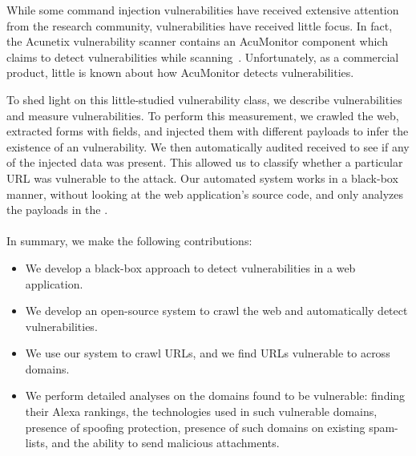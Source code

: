 While some command injection vulnerabilities have received extensive attention from the research community, \ehi vulnerabilities have received little focus. In fact, the Acunetix vulnerability scanner contains an AcuMonitor component which claims to detect \ehi vulnerabilities while scanning~\cite{acumonitor}. Unfortunately, as a commercial product, little is known about how AcuMonitor detects \ehi vulnerabilities. 

To shed light on this little-studied vulnerability class, we describe
\ehi vulnerabilities and measure \ehi vulnerabilities. To perform this
measurement, we crawled the web, extracted forms with \email fields,
and injected them with different payloads to infer the existence of an
\ehi vulnerability. We then automatically audited received \emails to
see if any of the injected data was present. This allowed us to
classify whether a particular URL was vulnerable to the attack. Our
automated system works in a black-box manner, without looking at the
web application's source code, and only analyzes the payloads in the
\emails.\\\\

In summary, we make the following contributions:
\begin{itemize}

\item We develop a black-box approach to detect \ehi vulnerabilities in a web application.

\item We develop an open-source system to crawl the web and automatically detect \ehi vulnerabilities.

\item We use our system to crawl \urls URLs, and we find \success URLs vulnerable to \ehi across \domains domains. 

\item We perform detailed analyses on the domains found to be vulnerable: finding their Alexa rankings, the technologies used in such vulnerable domains, presence of \email spoofing protection, presence of such domains on existing spam-lists, and the ability to send malicious attachments.

\end{itemize}
